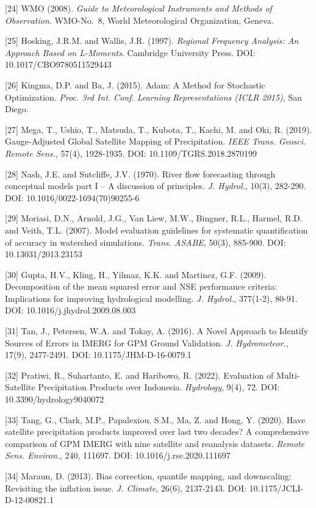 \documentclass[
]{article}
\begin{document}
{[}24{]} WMO (2008). \emph{Guide to Meteorological Instruments and
Methods of Observation}. WMO-No.~8, World Meteorological Organization,
Geneva.

{[}25{]} Hosking, J.R.M. and Wallis, J.R. (1997). \emph{Regional
Frequency Analysis: An Approach Based on L-Moments}. Cambridge
University Press. DOI: 10.1017/CBO9780511529443

{[}26{]} Kingma, D.P. and Ba, J. (2015). Adam: A Method for Stochastic
Optimization. \emph{Proc. 3rd Int. Conf. Learning Representations (ICLR
2015)}, San Diego.

{[}27{]} Mega, T., Ushio, T., Matsuda, T., Kubota, T., Kachi, M. and
Oki, R. (2019). Gauge-Adjusted Global Satellite Mapping of
Precipitation. \emph{IEEE Trans. Geosci. Remote Sens.}, 57(4),
1928-1935. DOI: 10.1109/TGRS.2018.2870199

{[}28{]} Nash, J.E. and Sutcliffe, J.V. (1970). River flow forecasting
through conceptual models part I -- A discussion of principles. \emph{J.
Hydrol.}, 10(3), 282-290. DOI: 10.1016/0022-1694(70)90255-6

{[}29{]} Moriasi, D.N., Arnold, J.G., Van Liew, M.W., Bingner, R.L.,
Harmel, R.D. and Veith, T.L. (2007). Model evaluation guidelines for
systematic quantification of accuracy in watershed simulations.
\emph{Trans. ASABE}, 50(3), 885-900. DOI: 10.13031/2013.23153

{[}30{]} Gupta, H.V., Kling, H., Yilmaz, K.K. and Martinez, G.F. (2009).
Decomposition of the mean squared error and NSE performance criteria:
Implications for improving hydrological modelling. \emph{J. Hydrol.},
377(1-2), 80-91. DOI: 10.1016/j.jhydrol.2009.08.003

{[}31{]} Tan, J., Petersen, W.A. and Tokay, A. (2016). A Novel Approach
to Identify Sources of Errors in IMERG for GPM Ground Validation.
\emph{J. Hydrometeor.}, 17(9), 2477-2491. DOI: 10.1175/JHM-D-16-0079.1

{[}32{]} Pratiwi, R., Suhartanto, E. and Haribowo, R. (2022). Evaluation
of Multi-Satellite Precipitation Products over Indonesia.
\emph{Hydrology}, 9(4), 72. DOI: 10.3390/hydrology9040072

{[}33{]} Tang, G., Clark, M.P., Papalexiou, S.M., Ma, Z. and Hong, Y.
(2020). Have satellite precipitation products improved over last two
decades? A comprehensive comparison of GPM IMERG with nine satellite and
reanalysis datasets. \emph{Remote Sens. Environ.}, 240, 111697. DOI:
10.1016/j.rse.2020.111697

{[}34{]} Maraun, D. (2013). Bias correction, quantile mapping, and
downscaling: Revisiting the inflation issue. \emph{J. Climate}, 26(6),
2137-2143. DOI: 10.1175/JCLI-D-12-00821.1
\end{document}
